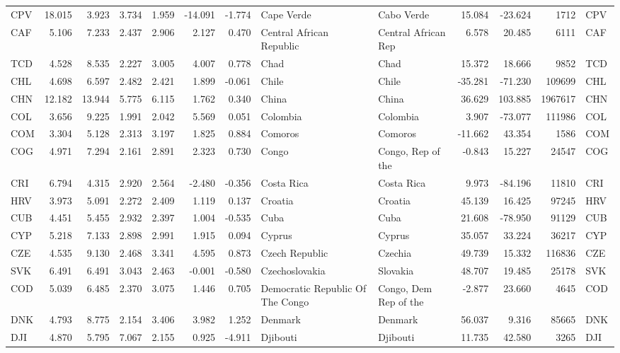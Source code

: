 \begin{tabular}{lrrrrrrllrrrl}
CPV & 18.015 & 3.923 & 3.734 & 1.959 & -14.091 & -1.774 & Cape Verde & Cabo Verde & 15.084 & -23.624 & 1712 & CPV \\
CAF & 5.106 & 7.233 & 2.437 & 2.906 & 2.127 & 0.470 & Central African Republic & Central African Rep & 6.578 & 20.485 & 6111 & CAF \\
TCD & 4.528 & 8.535 & 2.227 & 3.005 & 4.007 & 0.778 & Chad & Chad & 15.372 & 18.666 & 9852 & TCD \\
CHL & 4.698 & 6.597 & 2.482 & 2.421 & 1.899 & -0.061 & Chile & Chile & -35.281 & -71.230 & 109699 & CHL \\
CHN & 12.182 & 13.944 & 5.775 & 6.115 & 1.762 & 0.340 & China & China & 36.629 & 103.885 & 1967617 & CHN \\
COL & 3.656 & 9.225 & 1.991 & 2.042 & 5.569 & 0.051 & Colombia & Colombia & 3.907 & -73.077 & 111986 & COL \\
COM & 3.304 & 5.128 & 2.313 & 3.197 & 1.825 & 0.884 & Comoros & Comoros & -11.662 & 43.354 & 1586 & COM \\
COG & 4.971 & 7.294 & 2.161 & 2.891 & 2.323 & 0.730 & Congo & Congo, Rep of the & -0.843 & 15.227 & 24547 & COG \\
CRI & 6.794 & 4.315 & 2.920 & 2.564 & -2.480 & -0.356 & Costa Rica & Costa Rica & 9.973 & -84.196 & 11810 & CRI \\
HRV & 3.973 & 5.091 & 2.272 & 2.409 & 1.119 & 0.137 & Croatia & Croatia & 45.139 & 16.425 & 97245 & HRV \\
CUB & 4.451 & 5.455 & 2.932 & 2.397 & 1.004 & -0.535 & Cuba & Cuba & 21.608 & -78.950 & 91129 & CUB \\
CYP & 5.218 & 7.133 & 2.898 & 2.991 & 1.915 & 0.094 & Cyprus & Cyprus & 35.057 & 33.224 & 36217 & CYP \\
CZE & 4.535 & 9.130 & 2.468 & 3.341 & 4.595 & 0.873 & Czech Republic & Czechia & 49.739 & 15.332 & 116836 & CZE \\
SVK & 6.491 & 6.491 & 3.043 & 2.463 & -0.001 & -0.580 & Czechoslovakia & Slovakia & 48.707 & 19.485 & 25178 & SVK \\
COD & 5.039 & 6.485 & 2.370 & 3.075 & 1.446 & 0.705 & Democratic Republic Of The Congo & Congo, Dem Rep of the & -2.877 & 23.660 & 4645 & COD \\
DNK & 4.793 & 8.775 & 2.154 & 3.406 & 3.982 & 1.252 & Denmark & Denmark & 56.037 & 9.316 & 85665 & DNK \\
DJI & 4.870 & 5.795 & 7.067 & 2.155 & 0.925 & -4.911 & Djibouti & Djibouti & 11.735 & 42.580 & 3265 & DJI \\

\end{tabular}
